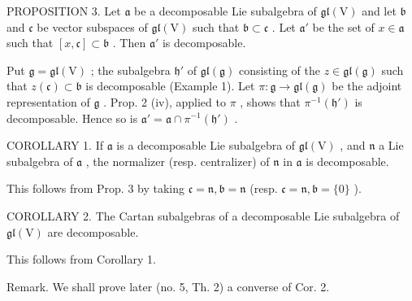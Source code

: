 PROPOSITION 3. Let \(\mathfrak{a}\) be a decomposable Lie subalgebra of \(\mathfrak{gl}(\mathrm{V})\) and let \(\mathfrak{b}\) and \(\mathfrak{c}\) be vector subspaces of \(\mathfrak{gl}(\mathrm{V})\) such that \(\mathfrak{b} \subset \mathfrak{c}\) . Let \(\mathfrak{a}'\) be the set of \(x \in \mathfrak{a}\) such that \([x, \mathfrak{c}] \subset \mathfrak{b}\) . Then \(\mathfrak{a}'\) is decomposable.

Put \(\mathfrak{g} = \mathfrak{gl}(\mathrm{V})\) ; the subalgebra \(\mathfrak{h}'\) of \(\mathfrak{gl}(\mathfrak{g})\) consisting of the \(z \in \mathfrak{gl}(\mathfrak{g})\) such that \(z(\mathfrak{c}) \subset \mathfrak{b}\) is decomposable (Example 1). Let \(\pi : \mathfrak{g} \to \mathfrak{gl}(\mathfrak{g})\) be the adjoint representation of \(\mathfrak{g}\) . Prop. 2 (iv), applied to \(\pi\) , shows that \(\pi^{-1}(\mathfrak{h}')\) is decomposable. Hence so is \(\mathfrak{a}' = \mathfrak{a} \cap \pi^{-1}(\mathfrak{h}')\) .

COROLLARY 1. If \(\mathfrak{a}\) is a decomposable Lie subalgebra of \(\mathfrak{gl}(\mathrm{V})\) , and \(\mathfrak{n}\) a Lie subalgebra of \(\mathfrak{a}\) , the normalizer (resp. centralizer) of \(\mathfrak{n}\) in \(\mathfrak{a}\) is decomposable.

This follows from Prop. 3 by taking \(\mathfrak{c} = \mathfrak{n},\mathfrak{b} = \mathfrak{n}\) (resp. \(\mathfrak{c} = \mathfrak{n},\mathfrak{b} = \{0\}\) ).

COROLLARY 2. The Cartan subalgebras of a decomposable Lie subalgebra of \(\mathfrak{gl}(\mathrm{V})\) are decomposable.

This follows from Corollary 1.

Remark. We shall prove later (no. 5, Th. 2) a converse of Cor. 2.

